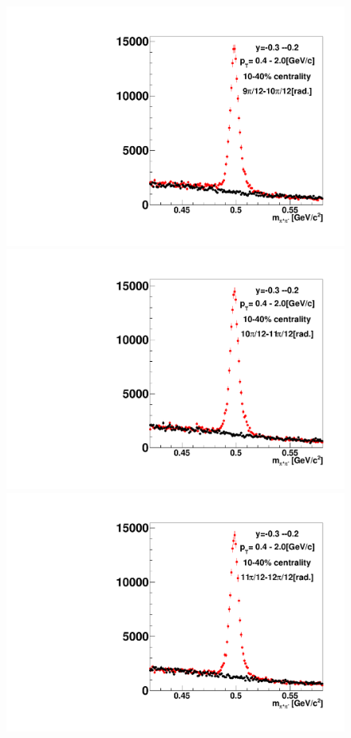 \begin{figure}[h]
\includegraphics[width=0.14\linewidth]{chapterX/fig/ks_v1_sig/kf_ptslice0_cent1_ks_flow_phi10_rap7_check.pdf}
\includegraphics[width=0.14\linewidth]{chapterX/fig/ks_v1_sig/kf_ptslice0_cent1_ks_flow_phi11_rap7_check.pdf}
\includegraphics[width=0.14\linewidth]{chapterX/fig/ks_v1_sig/kf_ptslice0_cent1_ks_flow_phi12_rap7_check.pdf}


\end{figure}
